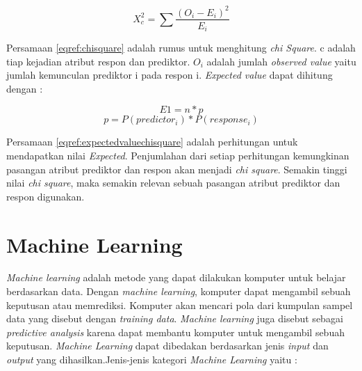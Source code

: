 \begin{equation}
X_{c}^{2} = \sum \frac{(O_i - E_i)^2}{E_i}
\label{eqref:chisquare}
\end{equation}

Persamaan \ref{eqref:chisquare} adalah rumus untuk menghitung \textit{chi Square}. c adalah tiap kejadian atribut respon dan prediktor. $O_i$ adalah jumlah \textit{observed value} yaitu jumlah kemunculan prediktor i pada respon i. \textit{Expected value} dapat dihitung dengan :

\begin{equation}
E1 = n * p 
\end{equation}
\begin{equation}
p = P(predictor_i) * P(response_i) 
\label{eqref:expectedvaluechisquare}
\end{equation}

Persamaan \ref{eqref:expectedvaluechisquare} adalah perhitungan untuk mendapatkan nilai \textit{Expected}. Penjumlahan dari setiap perhitungan kemungkinan pasangan atribut prediktor dan respon akan menjadi \textit{chi square}. Semakin tinggi nilai \textit{chi square}, maka semakin relevan sebuah pasangan atribut prediktor dan respon digunakan.


\section{Machine Learning}
\textit{Machine learning} adalah metode yang dapat dilakukan komputer untuk belajar berdasarkan data. Dengan \textit{machine learning}, komputer dapat mengambil sebuah keputusan atau memrediksi. Komputer akan mencari pola dari kumpulan sampel data yang disebut dengan \textit{training data}. \textit{Machine learning} juga disebut sebagai \textit{predictive analysis} karena dapat membantu komputer untuk mengambil sebuah keputusan. \textit{Machine Learning} dapat dibedakan berdasarkan jenis \textit{input} dan \textit{output} yang dihasilkan.Jenis-jenis kategori \textit{Machine Learning} yaitu :  
		
